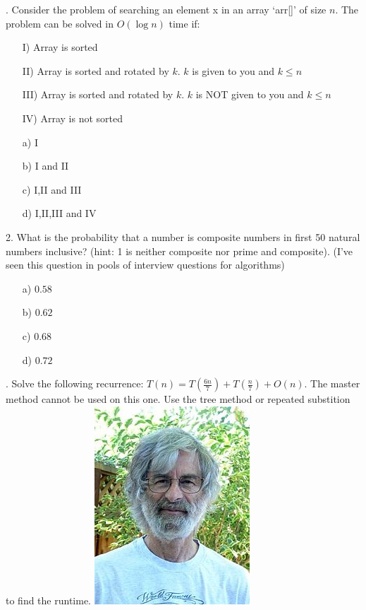 \documentclass[12pt]{article}
\begin{document}
. Consider the problem of searching an element x in an array ‘arr[]’ of size $n$. The problem can be solved in $O(\log{n})$ time if:\\
\begin{enumerate}
    \item[I)]Array is sorted
    \item[II)]Array is sorted and rotated by $k$. $k$ is given to you and $k \leq n$
    \item[III)]Array is sorted and rotated by $k$. $k$ is NOT given to you and $k \leq n$
    \item[IV)]Array is not sorted
\end{enumerate}
\begin{enumerate}
    \item[a)]I
    \item[b)]I and II
    \item[c)]I,II and III
    \item[d)]I,II,III and IV
\end{enumerate}
2. What is the probability that a number is composite numbers in first 50 natural numbers inclusive? (hint: 1 is neither composite nor prime and composite). (I've seen this question in pools of interview questions for algorithms) 
\begin{enumerate}
    \item[a)]$0.58$
    \item[b)]$0.62$
    \item[c)]$0.68$
    \item[d)]$0.72$
\end{enumerate}
. Solve the following recurrence: $T(n) = T(\frac{6n}{7}) + T(\frac{n}{7})  + O(n)$. The master method cannot be used on this one. Use the tree method or repeated substition to find the runtime.
\newpage
\noindent \includegraphics[scale = 0.5]{lamport.jpg}
\end{document}
